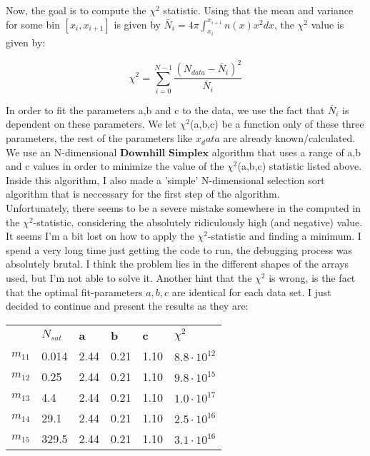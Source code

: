Now, the goal is to compute the $\chi^2$ statistic. Using that the mean and variance for some bin $[x_i,x_{i+1}]$ is given by $\bar{N}_{i} = 4 \pi \int_{x_{i}}^{x_{i+1}} n(x) x^2 dx$, the $\chi^2$ value is given by:

\begin{equation}	
	\chi^2 = \sum_{i=0}^{N-1} \frac{(N_{data} - \bar{N}_{i})^2}{\bar{N}_{i}}
\end{equation}

In order to fit the parameters a,b and c to the data, we use the fact that $\bar{N}_{i}$ is dependent on these parameters. We let $\chi^2$(a,b,c) be a function only of these three parameters, the rest of the parameters like $x_data$ are already known/calculated. We use an N-dimensional $\textbf{Downhill Simplex}$ algorithm that uses a range of a,b and c values in order to minimize the value of the $\chi^2$(a,b,c) statistic listed above. Inside this algorithm, I also made a 'simple' N-dimensional selection sort algorithm that is neccessary for the first step of the algorithm.\\

Unfortunately, there seems to be a severe mistake somewhere in the computed in the $\chi^2$-statistic, considering the absolutely ridiculously high (and negative) value. It seems I'm a bit lost on how to apply the $\chi^2$-statistic and finding a minimum. I spend a very long time just getting the code to run, the debugging process was absolutely brutal. I think the problem lies in the different shapes of the arrays used, but I'm not able to solve it. Another hint that the $\chi^2$ is wrong, is the fact that the optimal fit-parameters $a,b,c$ are identical for each data set. I just decided to continue and present the results as they are:

\begin{table}[!h]
\begin{tabular}{llllll}
\textbf{} & \textbf{$N_{sat}$} & \textbf{a} & \textbf{b} & \textbf{c} & \textbf{$\chi^{2}$} \\
\textbf{$m_{11}$} &    0.014       &     2.44      &      0.21     &      1.10     &     $8.8 \cdot 10^{12}$      \\
\textbf{$m_{12}$} &     0.25      &      2.44      &      0.21     &      1.10    &     $9.8 \cdot 10^{15}$      \\
\textbf{$m_{13}$} &     4.4      &     2.44      &      0.21     &      1.10    &     $1.0 \cdot 10^{17}$      \\
\textbf{$m_{14}$} &      29.1     &      2.44      &      0.21     &      1.10     &     $2.5 \cdot 10^{16}$      \\
\textbf{$m_{15}$} &       329.5    &      2.44      &      0.21     &      1.10    &         $3.1 \cdot 10^{16}$ 
\end{tabular}
\end{table}

